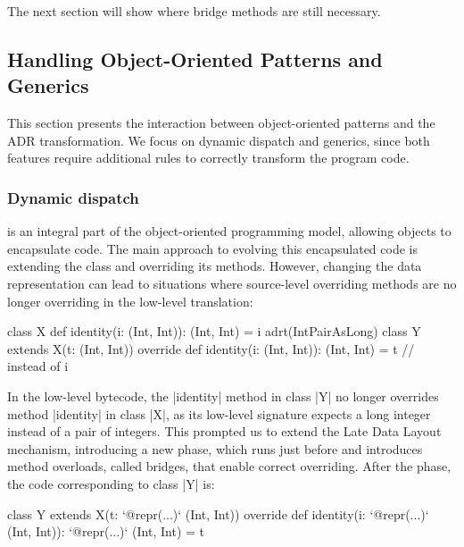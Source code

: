 The next section will show where bridge methods are still necessary.


\subsection{Handling Object-Oriented Patterns and Generics}
\label{sec:ildl:generics}

This section presents the interaction between object-oriented patterns and the ADR transformation. We focus on dynamic dispatch and generics, since both features require additional rules to correctly transform the program code.

\subsubsection{Dynamic dispatch}
is an integral part of the object-oriented programming model, allowing objects to encapsulate code. The main approach to evolving this encapsulated code is extending the class and overriding its methods. However, changing the data representation can lead to situations where source-level overriding methods are no longer overriding in the low-level translation:

\begin{lstlisting-nobreak}
class X {
  def identity(i: (Int, Int)): (Int, Int) = i
}
adrt(IntPairAsLong) {
  class Y extends X(t: (Int, Int)) {
    override def identity(i: (Int, Int)): (Int, Int) = t // instead of i
  }
}
\end{lstlisting-nobreak}

In the low-level bytecode, the |identity| method in class |Y| no longer overrides method |identity| in class |X|, as its low-level signature expects a long integer instead of a pair of integers. This prompted us to extend the Late Data Layout mechanism, introducing a new \bridge{} phase, which runs just before \coerce{} and introduces method overloads, called bridges, that enable correct overriding. After the \inject{} phase, the code corresponding to class |Y| is:

\begin{lstlisting-nobreak}
class Y extends X(t: `@repr(...)` (Int, Int)) {
  override def identity(i: `@repr(...)` (Int, Int)): `@repr(...)` (Int, Int) = t
}
\end{lstlisting-nobreak}

